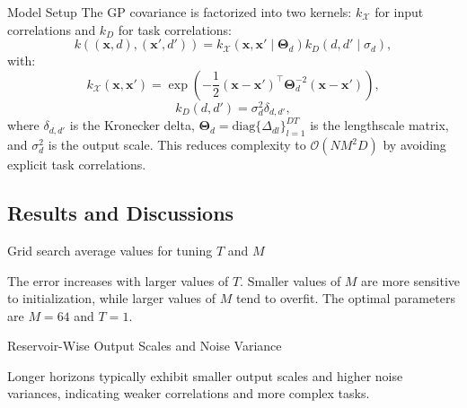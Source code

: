\begin{frame}{Model Setup}
	The GP covariance is factorized into two kernels: $k_{\mathcal{X}}$ for input correlations and $k_{D}$ for task correlations:
	\[
	k\left((\bm{x}, d), (\bm{x}', d')\right) = k_{\mathcal{X}}\left(\bm{x}, \bm{x}' \mid \bm{\Theta}_d \right) k_{D}\left(d, d' \mid \sigma_d \right),
	\]
	with:
	\[
	k_{\mathcal{X}}\left(\bm{x}, \bm{x}'\right) = \exp\left(-\frac{1}{2}(\bm{x} - \bm{x}')^\top \bm{\Theta}_d^{-2} (\bm{x} - \bm{x}')\right),
	\]
	\[
	k_{D}(d, d') = \sigma^2_d \delta_{d, d'},
	\]
	where $\delta_{d, d'}$ is the Kronecker delta, $\bm{\Theta}_d=\text{diag}\{\Delta_{dl}\}_{l=1}^{DT}$ is the lengthscale matrix, and $\sigma^2_d$ is the output scale. This reduces complexity to \textcolor{myNewColorB}{$\mathcal{O}(NM^2D)$} by avoiding explicit task correlations.
\end{frame}



\subsection{Results and Discussions}

\begin{frame}{Grid search average values for tuning $T$ and $M$}
	\begin{figure}[htbp]
		\setlength{} 
		\setlength{}
		\hspace{-1em}
	\end{figure}
	\vspace{-2em}
	\begin{block}{}
		The error increases with larger values of \( T \). Smaller values of \( M \) are more sensitive to initialization, while larger values of \( M \) tend to overfit. The optimal parameters are \( M = 64 \) and \( T = 1 \).
	\end{block}
\end{frame}


\begin{frame}{Reservoir-Wise Output Scales and Noise Variance}
	
	\begin{figure}[htbp]
		 \centering
		\tiny
	 	\setlength{} 
		\setlength{}
	\end{figure}
	\vspace{-2.0em}
	\begin{block}{}
	Longer horizons typically exhibit smaller output scales and higher noise variances, indicating weaker correlations and more complex tasks.
	\end{block}
\end{frame}


